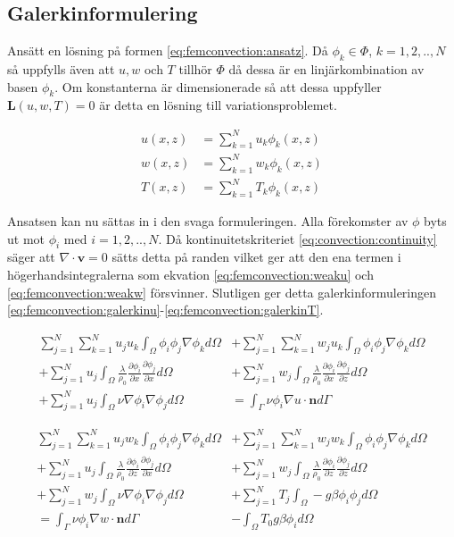 \subsection{Galerkinformulering}

Ansätt en lösning på formen \eqref{eq:femconvection:ansatz}.
Då $\phi_k \in \Phi$, $k=1,2,..,N$ så uppfylls även att $u,w$ och $T$ tillhör
$\Phi$ då dessa är en linjärkombination av basen $\phi_k$. Om konstanterna
är dimensionerade så att dessa uppfyller $\mathbf{L}(u,w,T) = 0$ är detta
en lösning till variationsproblemet. \cite{johnson2009}\cite{heath2002}\cite{lewis04}

\begin{align}
u(x,z) &= \sum^N_{k=1}u_k\phi_k(x,z)
\nonumber \\
w(x,z) &= \sum^N_{k=1}w_k\phi_k(x,z)
\nonumber \\
T(x,z) &= \sum^N_{k=1}T_k\phi_k(x,z)
\label{eq:femconvection:ansatz}
\end{align}

\noindent
Ansatsen kan nu sättas in i den svaga formuleringen.
Alla förekomster av $\phi$ byts ut mot $\phi_i$ med $i=1,2,..,N$. Då
kontinuitetskriteriet \eqref{eq:convection:continuity} säger att
$\nabla\cdot\mathbf{v} = 0$ sätts detta på randen vilket ger att den
ena termen i högerhandsintegralerna som ekvation \eqref{eq:femconvection:weaku} och
\eqref{eq:femconvection:weakw}
försvinner. Slutligen ger
detta galerkinformuleringen
\eqref{eq:femconvection:galerkinu}-\eqref{eq:femconvection:galerkinT}.

\begin{align}
\label{eq:femconvection:galerkinu}
\sum^N_{j=1}\sum^N_{k=1}u_ju_k\int_\Omega \phi_i\phi_j\nabla\phi_k d\Omega &+
\sum^N_{j=1}\sum^N_{k=1}w_ju_k\int_\Omega \phi_i\phi_j\nabla\phi_k d\Omega  \\ +
\nonumber
\sum^N_{j=1} u_j\int_\Omega\frac{\lambda}{\rho_0}\frac{\partial \phi_i}{\partial x}\frac{\partial \phi_j}{\partial x} d\Omega &+
\sum^N_{j=1} w_j\int_\Omega\frac{\lambda}{\rho_0}\frac{\partial \phi_i}{\partial x}\frac{\partial \phi_j}{\partial z} d\Omega  \\ +
\nonumber
\sum^N_{j=1} u_j \int_\Omega \nu\nabla\phi_i\nabla\phi_j d\Omega &=
\int_\Gamma \nu\phi_i\nabla u \cdot \mathbf{n} d\Gamma
\end{align}

\begin{align}
\label{eq:femconvection:galerkinw}
\sum^N_{j=1}\sum^N_{k=1}u_jw_k\int_\Omega \phi_i\phi_j\nabla\phi_k d\Omega &+
\sum^N_{j=1}\sum^N_{k=1}w_jw_k\int_\Omega \phi_i\phi_j\nabla\phi_k d\Omega \\ +
\nonumber
\sum^N_{j=1} u_j\int_\Omega \frac{\lambda}{\rho_0}\frac{\partial \phi_i}{\partial z}\frac{\partial \phi_j}{\partial x} d\Omega &+
\sum^N_{j=1} w_j\int_\Omega \frac{\lambda}{\rho_0}\frac{\partial \phi_i}{\partial z}\frac{\partial \phi_j}{\partial z} d\Omega \\ +
\nonumber
\sum^N_{j=1} w_j \int_\Omega \nu\nabla\phi_i\nabla\phi_j d\Omega &+
\sum^N_{j=1}T_j \int_\Omega - g\beta\phi_i\phi_j d\Omega \\
\nonumber
= \int_\Gamma \nu\phi_i\nabla w \cdot \mathbf{n} d\Gamma &- \int_\Omega T_0g\beta\phi_id\Omega
\end{align}


